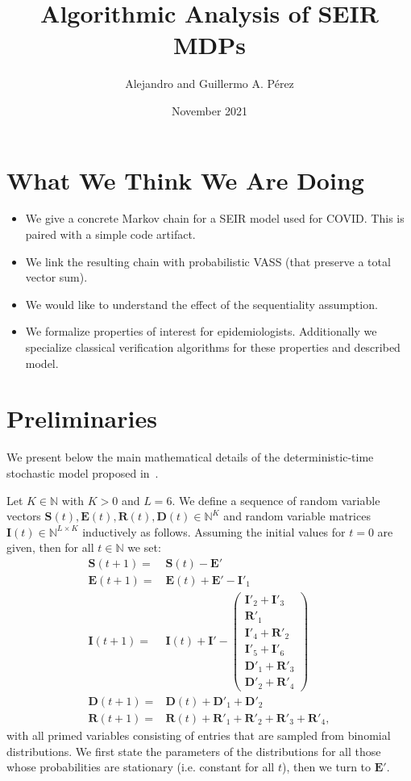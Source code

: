 \documentclass[a4paper]{article}
\title{Algorithmic Analysis of SEIR MDPs}
\author{Alejandro and Guillermo A. P\'erez}
\date{November 2021}
\renewcommand{\vec}[1]{\boldsymbol{#1}}
\theoremstyle{remark}
\begin{document}
\maketitle

\section{What We Think We Are Doing}
\begin{itemize}
    \item We give a concrete Markov chain for a SEIR model used for COVID. This is paired with a simple code artifact.
    \item We link the resulting chain with probabilistic VASS (that preserve a total vector sum).
    \item We would like to understand the effect of the sequentiality assumption.
    \item We formalize properties of interest for epidemiologists. Additionally we specialize classical verification algorithms for these properties and described model.
\end{itemize}


\section{Preliminaries}
We present below the main mathematical details of the deterministic-time stochastic model proposed in~\cite{abrams21}.

Let $K \in \mathbb{N}$ with $K > 0$ and $L = 6$. We define a sequence of random variable vectors $\vec{S}(t), \vec{E}(t), \vec{R}(t), \vec{D}(t) \in \mathbb{N}^K$ and random variable matrices $\vec{I}(t) \in \mathbb{N}^{L \times K}$ inductively as follows. Assuming the initial values for $t = 0$ are given, then for all $t \in \mathbb{N}$ we set:
\begin{align}
\label{eq:iteration}
    \vec{S}(t+1) = {} & \vec{S}(t) - \vec{E}'\\
    \vec{E}(t+1) = {} & \vec{E}(t) + \vec{E}' - \vec{I}'_1\\
    \vec{I}(t+1) = {} & \vec{I}(t) + \vec{I}' - 
    \begin{pmatrix}
    \vec{I}'_2 + \vec{I}'_3\\
    \vec{R}'_1\\
    \vec{I}'_4 + \vec{R}'_2\\
    \vec{I}'_5 + \vec{I}'_6\\
    \vec{D}'_1 + \vec{R}'_3\\
    \vec{D}'_2 + \vec{R}'_4
    \end{pmatrix}\\
    \vec{D}(t+1) = {} & \vec{D}(t) + \vec{D}'_1 + \vec{D}'_2\\
    \vec{R}(t+1) = {} & \vec{R}(t) + \vec{R}'_1 + \vec{R}'_2 + \vec{R}'_3 + \vec{R}'_4,
\end{align}
with all primed variables consisting of entries that are sampled from binomial distributions. We first state the parameters of the distributions for all those whose probabilities are stationary (i.e. constant for all $t$), then we turn to $\vec{E}'$.
\end{document}
